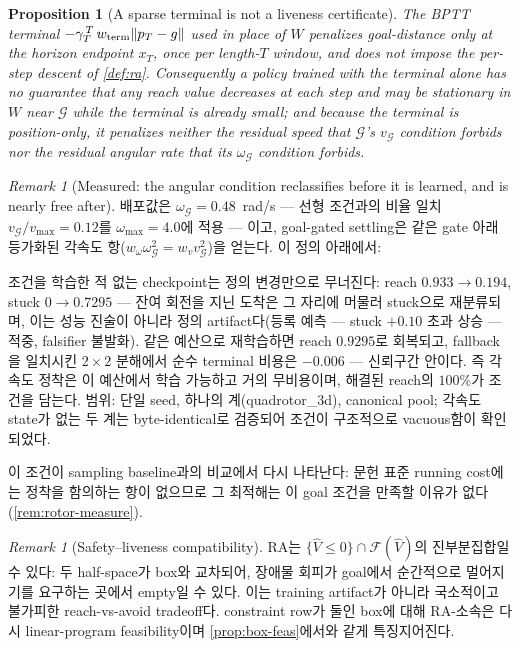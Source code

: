 \documentclass[11pt]{article}
\theoremstyle{plain}
\newtheorem{proposition}[theorem]{Proposition}
\theoremstyle{definition}
\theoremstyle{remark}
\newtheorem{remark}[theorem]{Remark}
\DeclarePairedDelimiter{\norm}{\lVert}{\rVert}
\newcommand{\Vhat}{\widehat V}
\begin{document}
\begin{proposition}[A sparse terminal is not a liveness certificate]\label{prop:terminal}
The BPTT terminal $-\gamma_T^{\,T}\,w_{\mathrm{term}}\norm{p_T-g}$ used in place of $W$
penalizes goal-distance only at the horizon endpoint $x_T$, once per length-$T$ window, and does
\emph{not} impose the per-step descent of \cref{def:ra}. Consequently a policy trained with the
terminal alone has no guarantee that any reach value decreases at each step and may be
stationary in $W$ near $\mathcal G$ while the terminal is already small; and because the
terminal is position-only, it penalizes neither the residual speed that $\mathcal G$'s
$v_{\mathcal G}$ condition forbids nor the residual angular rate that its
$\omega_{\mathcal G}$ condition forbids.
\end{proposition}

\begin{remark}[Measured: the angular condition reclassifies before it is learned, and is nearly
free after]\label{rem:reach-angular}
배포값은 $\omega_{\mathcal G}=0.48$~rad/s --- 선형 조건과의 비율 일치
$v_{\mathcal G}/v_{\max}=0.12$를 $\omega_{\max}=4.0$에 적용 --- 이고, goal-gated settling은
같은 gate 아래 등가화된 각속도 항($w_\omega\omega_{\mathcal G}^2=w_v v_{\mathcal G}^2$)을
얻는다. 이 정의 아래에서:

조건을 학습한 적 없는 checkpoint는 정의 변경만으로 무너진다: reach $0.933\to0.194$,
stuck $0\to0.7295$ --- 잔여 회전을 지닌 도착은 그 자리에 머물러 stuck으로 재분류되며, 이는
성능 진술이 아니라 정의 artifact다(등록 예측 --- stuck $+0.10$ 초과 상승 --- 적중, falsifier
불발화). 같은 예산으로 재학습하면 reach $0.9295$로 회복되고, fallback을 일치시킨 $2\times2$
분해에서 순수 terminal 비용은 $-0.006$ --- 신뢰구간 안이다. 즉 각속도 정착은 이 예산에서
학습 가능하고 거의 무비용이며, 해결된 reach의 $100\%$가 조건을 담는다. 범위: 단일 seed,
하나의 계(quadrotor\_3d), canonical pool; 각속도 state가 없는 두 계는 byte-identical로
검증되어 조건이 구조적으로 vacuous함이 확인되었다.

이 조건이 sampling baseline과의 비교에서 다시 나타난다: 문헌 표준 running cost에는 정착을
함의하는 항이 없으므로 그 최적해는 이 goal 조건을 만족할 이유가 없다(\cref{rem:rotor-measure}).
\end{remark}

\begin{remark}[Safety--liveness compatibility]\label{rem:ra-compat}
$\mathrm{RA}$는 $\{\Vhat\le0\}\cap\mathcal F(\Vhat)$의 진부분집합일 수 있다: 두 half-space가 box와
교차되어, 장애물 회피가 goal에서 순간적으로 멀어지기를 요구하는 곳에서 empty일 수 있다. 이는
training artifact가 아니라 국소적이고 불가피한 reach-vs-avoid tradeoff다. constraint row가 둘인
box에 대해 $\mathrm{RA}$-소속은 다시 linear-program feasibility이며 \cref{prop:box-feas}에서와
같게 특징지어진다.
\end{remark}
\end{document}
